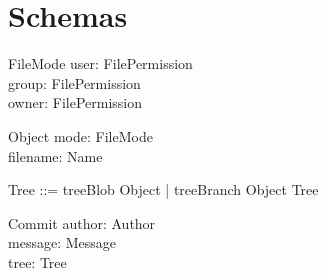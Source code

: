 \section{Schemas}

\begin{schema}{FileMode}
  user: FilePermission \\
  group: FilePermission \\
  owner: FilePermission
\end{schema}

\begin{schema}{Object}
  mode: FileMode \\
	filename: Name
\end{schema}

\begin{zed}
  Tree ::= treeBlob \ldata Object \rdata | treeBranch \ldata Object \cross \finset Tree \rdata
\end{zed}

\begin{schema}{Commit}
	author: Author \\
	message: Message \\
	tree: Tree
\end{schema}

